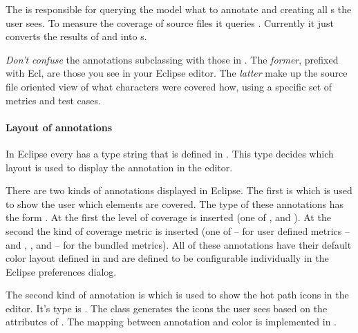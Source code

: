 The  is responsible for querying the model what
to annotate and creating all s the user sees. To measure the coverage
of source files it queries \linebreak
{}. Currently it just
converts the results of 
and 
into s.

\pagebreak
\emph{Don't confuse} the annotations subclassing 
\linebreak{}
with those in .  The \emph{former}, prefixed
with Ecl, are those you see in your Eclipse editor. The \emph{latter} make up the source file oriented
view of what characters were covered how, using a specific set of metrics and test cases.

\paragraph{Layout of annotations}
In Eclipse every  has a type string that is defined
in . This type decides which layout is used to display the annotation in the editor.

There are two kinds of annotations displayed in Eclipse. The first is 
which is used to show the user which elements are covered. The type of these annotations has the
form . At the first \code{*} the level
of coverage is inserted (one of ,  and ). At the second \code{*}
the kind of coverage metric is inserted (one of  -- for user defined metrics -- and
, ,  and  -- for the bundled metrics).
All of these annotations have their default color layout defined in  and are
defined to be configurable individually in the Eclipse preferences dialog.

The second kind of annotation is  which is used to 
show the hot path icons in the editor. It's type is
\linebreak{}. The class
 generates the icons the user sees based on
the attributes of . The mapping
between annotation and color is implemented in
\linebreak{}.

